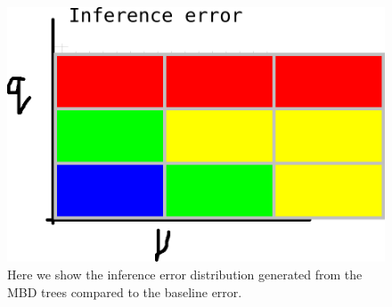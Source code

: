 \begin{figure}[!htbp]
  \includegraphics[width=\textwidth]{razzo-figures/fig_1.png}
  \caption{
    Here we show the inference error distribution generated from the MBD trees compared to the baseline error.
  }
  \label{fig:results}
\end{figure}